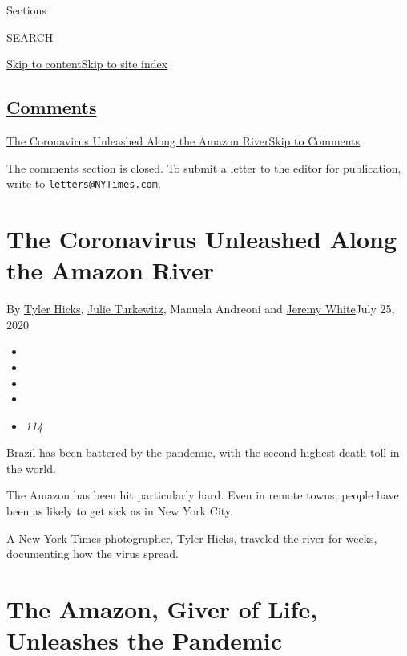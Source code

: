 Sections

SEARCH

\protect\hyperlink{site-content}{Skip to
content}\protect\hyperlink{site-index}{Skip to site index}

\hypertarget{comments}{%
\subsection{\texorpdfstring{\protect\hyperlink{commentsContainer}{Comments}}{Comments}}\label{comments}}

\href{}{The Coronavirus Unleashed Along the Amazon River}\href{}{Skip to
Comments}

The comments section is closed. To submit a letter to the editor for
publication, write to
\href{mailto:letters@NYTimes.com}{\nolinkurl{letters@NYTimes.com}}.

\hypertarget{the-coronavirus-unleashed-along-the-amazon-river}{%
\section{The Coronavirus Unleashed Along the Amazon
River}\label{the-coronavirus-unleashed-along-the-amazon-river}}

By \href{https://www.nytimes3xbfgragh.onion/by/tyler-hicks}{Tyler
Hicks},
\href{https://www.nytimes3xbfgragh.onion/by/julie-turkewitz}{Julie
Turkewitz}, Manuela Andreoni and
\href{https://www.nytimes3xbfgragh.onion/by/jeremy-white}{Jeremy
White}July 25, 2020

\begin{itemize}
\item
\item
\item
\item
\item
  \emph{114}
\end{itemize}

Brazil has been battered by the pandemic, with the second-highest death
toll in the world.

The Amazon has been hit particularly hard. Even in remote towns, people
have been as likely to get sick as in New York City.

A New York Times photographer, Tyler Hicks, traveled the river for
weeks, documenting how the virus spread.

\hypertarget{the-amazon-giver-of-life-unleashes-the-pandemic}{%
\section{The Amazon, Giver of Life, Unleashes the
Pandemic}\label{the-amazon-giver-of-life-unleashes-the-pandemic}}

